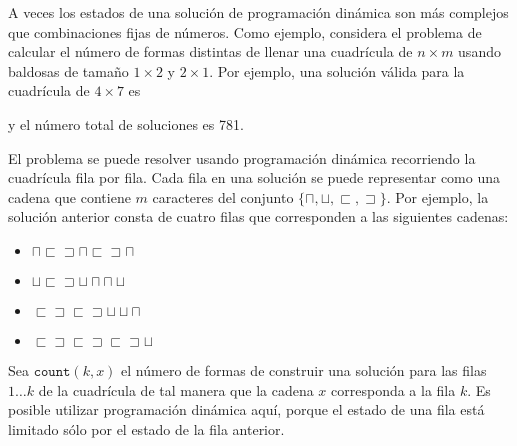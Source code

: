 A veces los estados de una solución de programación dinámica
son más complejos que combinaciones fijas de números.
Como ejemplo,
considera el problema de calcular
el número de formas distintas de
llenar una cuadrícula de $n \times m$ usando
baldosas de tamaño $1 \times 2$ y $2 \times 1$.
Por ejemplo, una solución válida
para la cuadrícula de $4 \times 7$ es
\begin{center}
\end{center}
y el número total de soluciones es 781.

El problema se puede resolver usando programación dinámica
recorriendo la cuadrícula fila por fila.
Cada fila en una solución se puede representar como una
cadena que contiene $m$ caracteres del conjunto
$\{\sqcap, \sqcup, \sqsubset, \sqsupset \}$.
Por ejemplo, la solución anterior consta de cuatro filas
que corresponden a las siguientes cadenas:
\begin{itemize}
\item
$\sqcap \sqsubset \sqsupset \sqcap \sqsubset \sqsupset \sqcap$
\item
$\sqcup \sqsubset \sqsupset \sqcup \sqcap \sqcap \sqcup$
\item
$\sqsubset \sqsupset \sqsubset \sqsupset \sqcup \sqcup \sqcap$ 
\item
$\sqsubset \sqsupset \sqsubset \sqsupset \sqsubset \sqsupset \sqcup$
\end{itemize}

Sea $\texttt{count}(k,x)$ el número de formas de
construir una solución para las filas $1 \ldots k$
de la cuadrícula de tal manera que la cadena $x$ corresponda a la fila $k$.
Es posible utilizar programación dinámica aquí,
porque el estado de una fila está limitado
sólo por el estado de la fila anterior.

